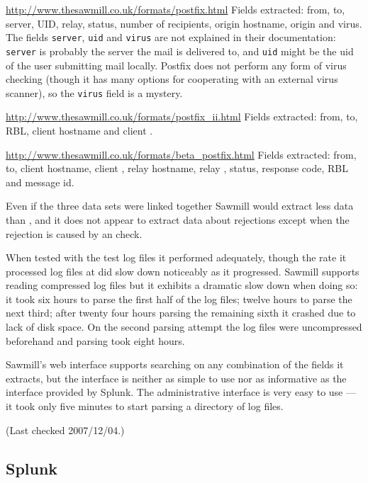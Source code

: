 \url{http://www.thesawmill.co.uk/formats/postfix.html} \newline Fields
extracted: from, to, server, UID, relay, status, number of recipients,
origin hostname, origin \IP{} and virus.  The fields \texttt{server},
\texttt{uid} and \texttt{virus} are not explained in their documentation:
\texttt{server} is probably the server the mail is delivered to, and
\texttt{uid} might be the uid of the user submitting mail locally.  Postfix
does not perform any form of virus checking (though it has many options for
cooperating with an external virus scanner), so the \texttt{virus} field is
a mystery.

\url{http://www.thesawmill.co.uk/formats/postfix_ii.html} \newline Fields
extracted: from, to, RBL, client hostname and client \IP{}\@.

\url{http://www.thesawmill.co.uk/formats/beta_postfix.html} \newline Fields
extracted: from, to, client hostname, client \IP{}, relay hostname, relay
\IP{}, status, response code, RBL and message id.

Even if the three data sets were linked together Sawmill would extract less
data than \parsername{}, and it does not appear to extract data about
rejections except when the rejection is caused by an \DNSBL{} check.

When tested with the \numberOFlogFILES{} test log files it performed
adequately, though the rate it processed log files at did slow down
noticeably as it progressed.  Sawmill supports reading compressed log files
but it exhibits a dramatic slow down when doing so: it took six hours to
parse the first half of the log files; twelve hours to parse the next
third; after twenty four hours parsing the remaining sixth it crashed due
to lack of disk space.  On the second parsing attempt the log files were
uncompressed beforehand and parsing took eight hours.

Sawmill's web interface supports searching on any combination of the fields
it extracts, but the interface is neither as simple to use nor as
informative as the interface provided by Splunk.  The administrative
interface is very easy to use --- it took only five minutes to start
parsing a directory of log files.

(Last checked 2007/12/04.)

\subsection{Splunk}

